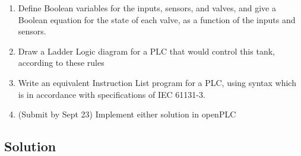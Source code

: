 \documentclass[11pt]{article}
\begin{document}
\begin{enumerate}
    \item Define Boolean variables for the inputs, sensors, and valves, and give
          a Boolean equation for the state of each valve, as a function of the inputs
          and sensors.
    \item Draw a Ladder Logic diagram for a PLC that would control this tank,
          according to these rules
    \item Write an equivalent Instruction List program for a PLC, using syntax
          which is in accordance with specifications of IEC 61131-3.
    \item (Submit by Sept 23) Implement either solution in openPLC
\end{enumerate}

\pagebreak
\subsection*{Solution}
\end{document}
